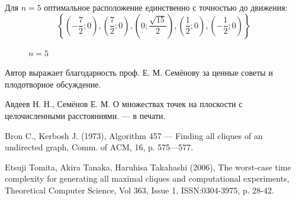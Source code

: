 \documentclass{article}
\begin{document}
Для $n=5$ оптимальное расположение единственно с точностью до движения:
$$
\left\{\left( -\frac{7}{2} ; 0\right),\left( \frac{7}{2} ; 0\right),\left( 0 ; \frac{\sqrt{15}}{2}\right),\left( \frac{1}{2} ; 0\right),\left( -\frac{1}{2} ; 0\right)\right\}
$$


\begin{figure}[h]
\caption{$n=5$}
\label{ris:image}
\end{figure}



Автор выражает благодарность проф. Е. М. Семёнову за ценные советы и плодотворное обсуждение.




\newpage

\begin{thebibliography}{99}

 Авдеев Н. Н., Семёнов Е. М. О множествах точек на плоскости с целочисленными расстояниями. --- в печати.

 Bron C., Kerbosh J. (1973), Algorithm 457 — Finding all cliques of an undirected graph, Comm. of ACM, 16, p. 575—577.

 Etsuji Tomita, Akira Tanaka, Haruhisa Takahashi (2006), The worst-case time complexity for generating all maximal cliques and computational experiments, Theoretical Computer Science, Vol 363, Issue 1, ISSN:0304-3975, p. 28-42.

\end{thebibliography}














\end{document}
